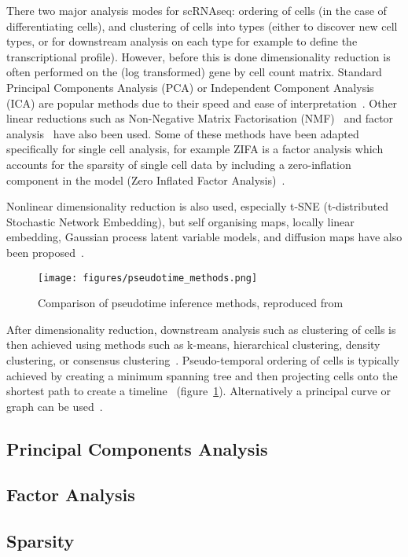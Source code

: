 There two major analysis modes for scRNAseq: ordering of cells (in the case of differentiating cells), and clustering of cells into types (either to discover new cell types, or for downstream analysis on each type for example to define the transcriptional profile). However, before this is done dimensionality reduction is often performed on the (log transformed) gene by cell count matrix. Standard Principal Components Analysis (PCA) or Independent Component Analysis (ICA) are popular methods due to their speed and ease of interpretation~\cite{Satija2015Spatial,Trapnell2014Dynamics}. Other linear reductions such as Non-Negative Matrix Factorisation (NMF)~\cite{Shao2017Robust} and factor analysis~\cite{Buettner2015Computational} have also been used. Some of these methods have been adapted specifically for single cell analysis, for example ZIFA is a factor analysis which accounts for the sparsity of single cell data by including a zero-inflation component in the model (Zero Inflated Factor Analysis)~\cite{Pierson2015ZIFA}.

Nonlinear dimensionality reduction is also used, especially t-SNE (t-distributed Stochastic Network Embedding), but self organising maps, locally linear embedding, Gaussian process latent variable models, and diffusion maps have also been proposed~\cite{Kim2015SingleCell,Welch2016SLICER,Haghverdi2015Diffusion,Campbell2015Bayesian}.

\begin{figure}[H]
	\centering
	\texttt{[image: figures/pseudotime\_methods.png]}
	\caption{Comparison of pseudotime inference methods, reproduced from~\cite{Cannoodt2016Computational}}
	\label{fig:pseudotime_methods}
\end{figure}

After dimensionality reduction, downstream analysis such as clustering of cells is then achieved using methods such as k-means, hierarchical clustering, density clustering, or consensus clustering~\cite{Zurauskiene2016PcaReduce,Kiselev2017SC3,Guo2015SINCERA,Satija2015Spatial}. Pseudo-temporal ordering of cells is typically achieved by creating a minimum spanning tree and then projecting cells onto the shortest path to create a timeline~\cite{Trapnell2014Dynamics,Ji2016TSCAN} (figure~\ref{fig:pseudotime_methods}). Alternatively a principal curve or graph can be used~\cite{Marco2014Bifurcation,Qiu2017Reversed}.




\subsection{Principal Components Analysis}

\subsection{Factor Analysis}

\subsection{Sparsity}

